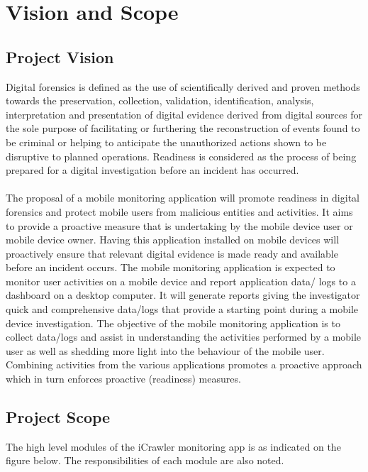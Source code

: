 \documentclass[hidelinks, 12pt, oneside]{article}
\begin{document}
	
	\tableofcontents
	
	\newpage
	\section{Vision and Scope}
		\subsection{Project Vision}
		\vspace{0.3 cm}
	  	Digital forensics is defined as the use of scientifically derived and proven methods towards the preservation, 			collection, validation, identification, analysis, interpretation and presentation of digital evidence derived 			from digital sources for the sole purpose of facilitating or furthering the reconstruction of events found to 			be criminal or helping to anticipate the unauthorized actions shown to be disruptive to planned operations.
		Readiness is considered as the process of being prepared for a digital investigation before an incident has 			occurred. \\\\
		The proposal of a mobile monitoring application will promote readiness in digital forensics and protect mobile 			users from malicious entities and activities. It aims to provide a proactive measure that is undertaking by the 		mobile device user or mobile device owner. Having this application installed on mobile devices will proactively 		ensure that relevant digital evidence is made ready and available before an incident occurs. The mobile 				monitoring application is expected to monitor user activities on a mobile device and report application data/			logs to a dashboard on a desktop computer. It will generate reports giving the investigator quick and 					comprehensive data/logs that provide a starting point during a mobile device investigation. \newline\newline
		The objective of the mobile monitoring application is to collect data/logs and assist in understanding the 				activities performed by a mobile user as well as shedding more light into the behaviour of the mobile user. 			Combining activities from the various applications promotes a proactive approach which in turn enforces 				proactive (readiness) measures.
		
		\newpage
		\subsection{Project Scope}	
		The high level modules of the iCrawler monitoring app is as indicated on the figure below. The responsibilities 			of each module are also noted.
		
\end{document}
